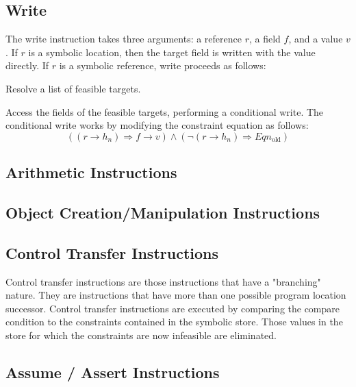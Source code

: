 \subsection{Write}
The write instruction takes three arguments: a reference $r$, a field $f$, and a value $v$. If $r$ is a symbolic location, then the target field is written with the value directly. If $r$ is a symbolic reference, write proceeds as follows:
\begin{compactenum}
\item Resolve a list of feasible targets.
\item Access the fields of the feasible targets, performing a conditional write. The conditional write works by modifying the constraint equation as follows:
\begin{equation}
  ((r\rightarrow h_n) \Rightarrow f\rightarrow v)  \wedge (\lnot (r\rightarrow h_n) \Rightarrow Eqn_\mathrm{old})
\end{equation}
\end{compactenum}

\subsection{Arithmetic Instructions}
\subsection{Object Creation/Manipulation Instructions}
\subsection{Control Transfer Instructions}
Control transfer instructions are those instructions that have a "branching" nature. They are instructions that have more than one possible program location successor. Control transfer instructions are executed by comparing the compare condition to the constraints contained in the symbolic store. Those values in the store for which the constraints are now infeasible are eliminated. 
\subsection{Assume / Assert Instructions}
